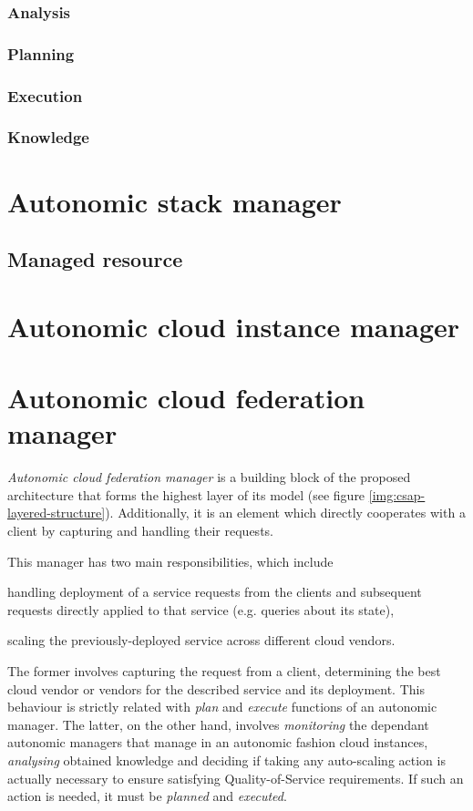 \subsubsection{Analysis}

\subsubsection{Planning}

\subsubsection{Execution}

\subsubsection{Knowledge}

\section{Autonomic stack manager}
\subsection{Managed resource}


\section{Autonomic cloud instance manager}

\section{Autonomic cloud federation manager}
\emph{Autonomic cloud federation manager} is a building block of the proposed architecture that forms the highest layer of its model (see figure \ref{img:csap-layered-structure}). Additionally, it is an element which directly cooperates with a client by capturing and handling their requests.

This manager has two main responsibilities, which include
\begin{inparaenum}[1)]
\item handling deployment of a service requests from the clients and subsequent requests directly applied to that service (e.g. queries about its state), 
\item scaling the previously-deployed service across different cloud vendors.
\end{inparaenum}
The former involves capturing the request from a client, determining the best cloud vendor or vendors for the described service and its deployment. This behaviour is strictly related with \emph{plan} and \emph{execute} functions of an autonomic manager. The latter, on the other hand, involves \emph{monitoring} the dependant autonomic managers that manage in an autonomic fashion cloud instances, \emph{analysing} obtained knowledge and deciding if taking any auto-scaling action is actually necessary to ensure satisfying Quality-of-Service requirements. If such an action is needed, it must be \emph{planned} and \emph{executed}.

